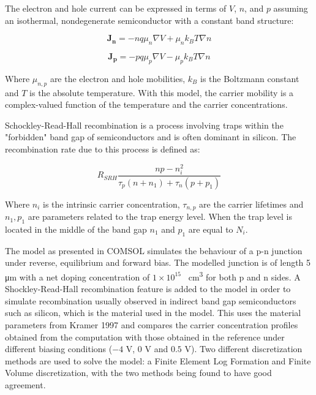 The electron and hole current can be expressed in terms of $V$, $n$, and $p$ assuming an isothermal, nondegenerate semiconductor with a constant band structure:

\begin{equation}
\bm{J_{n}}=-nq\mu_{n}\nabla V+\mu_{n}k_{B}T\nabla n
\end{equation}

\begin{equation}
\bm{J_{p}}=-pq\mu_{p}\nabla V-\mu_{p}k_{B}T\nabla n
\end{equation}

Where $\mu_{n,p}$ are the electron and hole mobilities, $k_{B}$ is the Boltzmann constant and $T$ is the absolute temperature. With this model, the carrier mobility is a complex-valued function of the temperature and the carrier concentrations.

Schockley-Read-Hall recombination is a process involving traps within the "forbidden" band gap of semiconductors and is often dominant in silicon. The recombination rate due to this process is defined as:

\begin{equation}
R_{SRH} \frac{np-n_{i}^2}{\tau_{p}\left(n+n_{1}\right)+\tau_{n}\left(p+p_{1}\right)}
\end{equation}

Where $n_{i}$ is the intrinsic carrier concentration, $\tau_{n,p}$ are the carrier lifetimes and $n_{1},p_{1}$ are parameters related to the trap energy level. When the trap level is located in the middle of the band gap $n_{1}$ and $p_{1}$ are equal to $N_{i}$.

The model as presented in COMSOL simulates the behaviour of a p-n junction under reverse, equilibrium and forward bias. The modelled junction is of length 5 \si{\micro\metre} with a net doping concentration of $1\times10^{15}$ \si{\per\centi\metre\cubed} for both p and n sides. A Shockley-Read-Hall recombination feature is added to the model in order to simulate recombination usually observed in indirect band gap semiconductors such as silicon, which is the material used in the model. This uses the material parameters from Kramer 1997 \cite{kramer:1997} and compares the carrier concentration profiles obtained from the computation with those obtained in the reference under different biasing conditions ($-4$ \si{\volt}, $0$ \si{\volt} and $0.5$ \si{\volt}). Two different discretization methods are used to solve the model: a Finite Element Log Formation and Finite Volume discretization, with the two methods being found to have good agreement.

